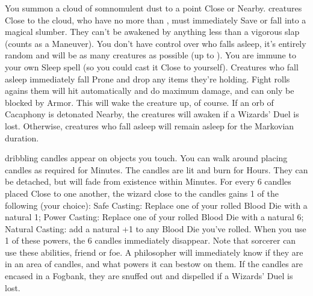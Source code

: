 {You summon a cloud of somnomulent dust to a point Close or Nearby. 
\SUMDICE creatures Close to the cloud, who have no more than \DICE \HD, must
immediately Save or fall into a magical slumber.   They can't be awakened by
anything less than a vigorous slap (counts as a Maneuver).  You don't have
control over who falls asleep, it's entirely random and will be as many
creatures as possible (up to \SUMDICE).  You are immune to your own Sleep
spell (so you could cast it Close to yourself).  Creatures who fall asleep
immediately fall Prone and drop any items they're holding.  Fight rolls
agains them will hit automatically and do maximum damage, and can only be
blocked by Armor.  This will wake the creature up, of course.  If an orb of
Cacaphony is detonated Nearby, the creatures will awaken if a Wizards' Duel
is lost.  Otherwise, creatures who fall asleep will remain asleep for the
Markovian duration.   




\SPELL[
  Name=Summon Candles,
  Link=wizardry-summon-candles,
  Paradigm=Force,
  Save=N,
  Duration=Varies,
  Counter=\mylink{Fogbank}{wizardry-fogbank} ,
  Keywords=None,
  Target=Close
]



\SUMDICE dribbling candles appear on objects you touch. You can walk around
placing candles as required for Minutes. The candles are lit and burn for
Hours. They can be detached, but will fade from existence within Minutes. 
For every 6 candles placed Close to one another, the wizard close to the
candles gains 1 of the following (your choice): Safe Casting: Replace one of
your rolled Blood Die with a natural 1; Power Casting: Replace one of your
rolled Blood Die with a natural 6; Natural Casting: add a natural +1 to any
Blood Die you've rolled.  When you use 1 of these powers, the 6
candles immediately disappear.  Note that  sorcerer can use these
abilities, friend or foe.  A philosopher will immediately know if they are in
an area of candles, and what powers it can bestow on them.  If the candles
are encased in a Fogbank, they are snuffed out and dispelled if a Wizards'
Duel is lost.





\SPELL[
  Name=Suspend Objects,
  Link=wizardry-suspend-objects,
  Paradigm=Force,
  Save=Y (negate),
  Duration=Concentration,
  Counter=\mylink{Levitating Disc}{wizardry-levitating-disc} ,
  Keywords=None,
  Target=Any Distance
]



}
